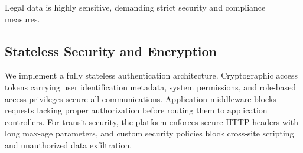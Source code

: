 \documentclass[conference]{IEEEtran}
\begin{document}
Legal data is highly sensitive, demanding strict security and compliance measures.

\subsection{Stateless Security and Encryption}
We implement a fully stateless authentication architecture. Cryptographic access tokens carrying user identification metadata, system permissions, and role-based access privileges secure all communications. Application middleware blocks requests lacking proper authorization before routing them to application controllers. For transit security, the platform enforces secure HTTP headers with long max-age parameters, and custom security policies block cross-site scripting and unauthorized data exfiltration.
\end{document}
